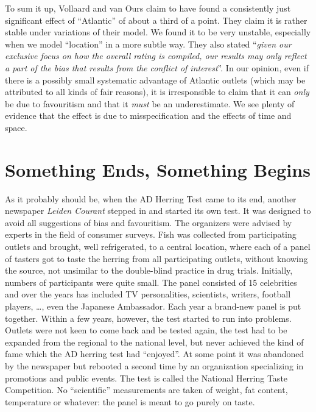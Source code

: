 \documentclass[alpha-refs]{wiley-article}
\begin{document}
To sum it up, Vollaard and van Ours claim to have found a consistently just significant effect of ``Atlantic'' of about a third of a point. They claim it is rather stable under variations of their model. We found it to be very unstable, especially when we model ``location'' in a more subtle way. They also stated ``\emph{given our exclusive focus on how the overall rating is compiled, our results may only reflect a part of the bias that results from the conflict of interest}''. 
In our opinion, even if there is a possibly small systematic advantage of Atlantic outlets (which may be attributed to all kinds of fair reasons), it is irresponsible to claim that it can \emph{only} be due to favouritism and that it \emph{must} be an underestimate.  We see plenty of evidence that the effect is due to misspecification and the effects of time and space.  




\section{Something Ends, Something Begins}\label{whatnext}



As it probably should be, when the AD Herring Test came to its end, another newspaper \emph{Leiden Courant} stepped in and started its own test.  It was designed to avoid all suggestions of bias and favouritism. The organizers were advised by experts in the field of consumer surveys. Fish was collected from participating outlets and brought, well refrigerated, to a central location, where each of a panel of tasters got to taste the herring from all participating outlets, without knowing the source, not unsimilar to the double-blind practice in drug trials. Initially, numbers of participants were quite small. The panel consisted of 15 celebrities and over the years has included TV personalities, scientists, writers, football players, \dots, even the Japanese Ambassador. Each year a brand-new panel is put together. Within a few years, however, the test started to run into problems. Outlets were not keen to come back and be tested again, the test had to be expanded from the regional to the national level, but never achieved the kind of fame which the AD herring test had ``enjoyed''. At some point it was abandoned by the newspaper but rebooted a second time by an organization specializing in promotions and public events.  The test is called the National Herring Taste Competition.  No ``scientific'' measurements are taken of weight, fat content, temperature or whatever: the panel is meant to go purely on taste.
\end{document}
